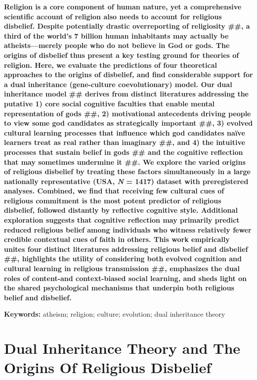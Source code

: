\documentclass[]{article}
\begin{document}
\textbf{Religion is a core component of human nature, yet a
comprehensive scientific account of religion also needs to account for
religious disbelief. Despite potentially drastic overreporting of
religiosity \#\#, a third of the world's 7 billion human inhabitants may
actually be atheists---merely people who do not believe in God or gods.
The origins of disbelief thus present a key testing ground for theories
of religion. Here, we evaluate the predictions of four theoretical
approaches to the origins of disbelief, and find considerable support
for a dual inheritance (gene-culture coevolutionary) model. Our dual
inheritance model \#\# derives from distinct literatures addressing the
putative 1) core social cognitive faculties that enable mental
representation of gods \#\#, 2) motivational antecedents driving people
to view some god candidates as strategically important \#\#, 3) evolved
cultural learning processes that influence which god candidates naïve
learners treat as real rather than imaginary \#\#, and 4) the intuitive
processes that sustain belief in gods \#\# and the cognitive reflection
that may sometimes undermine it \#\#. We explore the varied origins of
religious disbelief by treating these factors simultaneously in a large
nationally representative (USA, \emph{N} = 1417) dataset with
preregistered analyses. Combined, we find that receiving few cultural
cues of religious commitment is the most potent predictor of religious
disbelief, followed distantly by reflective cognitive style. Additional
exploration suggests that cognitive reflection may primarily predict
reduced religious belief among individuals who witness relatively fewer
credible contextual cues of faith in others. This work empirically
unites four distinct literatures addressing religious belief and
disbelief \#\#, highlights the utility of considering both evolved
cognition and cultural learning in religious transmission \#\#,
emphasizes the dual roles of content-and context-biased social learning,
and sheds light on the shared psychological mechanisms that underpin
both religious belief and disbelief. }

\textbf{Keywords:} atheism; religion; culture; evolution; dual
inheritance theory

\pagebreak

\hypertarget{dual-inheritance-theory-and-the-origins-of-religious-disbelief-1}{%
\section{Dual Inheritance Theory and The Origins Of Religious
Disbelief}\label{dual-inheritance-theory-and-the-origins-of-religious-disbelief-1}}
\end{document}
